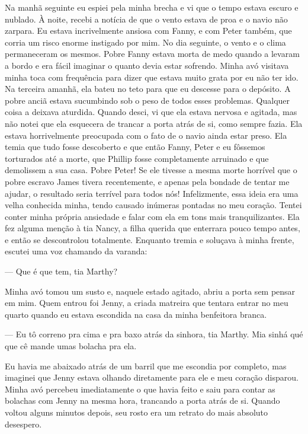 Na manhã seguinte eu espiei pela minha
brecha e vi que o tempo estava escuro e nublado. À noite, recebi a
notícia de que o vento estava de proa e o navio não zarpara. Eu estava
incrivelmente ansiosa com Fanny, e com Peter também, que corria um risco
enorme instigado por mim. No dia seguinte, o vento e o clima
permaneceram os mesmos. Pobre Fanny estava morta de medo quando a
levaram a bordo e era fácil imaginar o quanto devia estar sofrendo.
Minha avó visitava minha toca com frequência para dizer que estava muito
grata por eu não ter ido. Na terceira amanhã, ela bateu no teto para que
eu descesse para o depósito. A pobre anciã estava sucumbindo sob o peso
de todos esses problemas. Qualquer coisa a deixava aturdida. Quando
desci, vi que ela estava nervosa e agitada, mas não notei que ela
esquecera de trancar a porta atrás de si, como sempre fazia. Ela estava
horrivelmente preocupada com o fato de o navio ainda estar preso. Ela
temia que tudo fosse descoberto e que então Fanny, Peter e eu fôssemos
torturados até a morte, que Phillip fosse completamente arruinado e que
demolissem a sua casa. Pobre Peter! Se ele tivesse a mesma morte
horrível que o pobre escravo James tivera recentemente, e apenas pela
bondade de tentar me ajudar, o resultado seria terrível para todos nós!
Infelizmente, essa ideia era uma velha conhecida minha, tendo causado
inúmeras pontadas no meu coração. Tentei conter minha própria ansiedade
e falar com ela em tons mais tranquilizantes. Ela fez alguma menção à
tia Nancy, a filha querida que enterrara pouco tempo antes, e então se
descontrolou totalmente. Enquanto tremia e soluçava à minha frente,
escutei uma voz chamando da varanda:

--- Que é que tem, tia Marthy?

Minha avó tomou um susto e, naquele estado agitado, abriu a porta sem
pensar em mim. Quem entrou foi Jenny, a criada matreira que tentara
entrar no meu quarto quando eu estava escondida na casa da minha
benfeitora branca.

--- Eu tô correno pra cima e pra baxo atrás da sinhora, tia Marthy. Mia
sinhá qué que cê mande umas bolacha pra ela.

Eu havia me abaixado atrás de um barril que me escondia por completo,
mas imaginei que Jenny estava olhando diretamente para ele e meu coração
disparou. Minha avó percebeu imediatamente o que havia feito e saiu para
contar as bolachas com Jenny na mesma hora, trancando a porta atrás de
si. Quando voltou alguns minutos depois, seu rosto era um retrato do
mais absoluto desespero.

